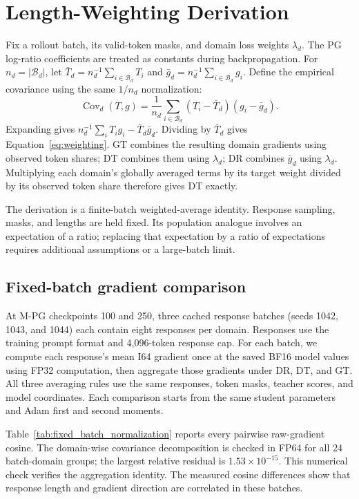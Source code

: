 \section{Length-Weighting Derivation}
\label{app:normalization}

Fix a rollout batch, its valid-token masks, and domain loss weights $\lambda_d$. The PG log-ratio coefficients are treated as constants during backpropagation. For $n_d=|\mathcal B_d|$, let $\bar T_d=n_d^{-1}\sum_{i\in\mathcal B_d}T_i$ and $\bar g_d=n_d^{-1}\sum_{i\in\mathcal B_d}g_i$. Define the empirical covariance using the same $1/n_d$ normalization:
\begin{equation}
\operatorname{Cov}_d(T,g)=\frac{1}{n_d}\sum_{i\in\mathcal B_d}(T_i-\bar T_d)(g_i-\bar g_d).
\end{equation}
Expanding gives $n_d^{-1}\sum_iT_i g_i-\bar T_d\bar g_d$. Dividing by $\bar T_d$ gives Equation~\ref{eq:weighting}. GT combines the resulting domain gradients using observed token shares; DT combines them using $\lambda_d$; DR combines $\bar g_d$ using $\lambda_d$. Multiplying each domain's globally averaged terms by its target weight divided by its observed token share therefore gives DT exactly.

The derivation is a finite-batch weighted-average identity. Response sampling, masks, and lengths are held fixed. Its population analogue involves an expectation of a ratio; replacing that expectation by a ratio of expectations requires additional assumptions or a large-batch limit.

\subsection{Fixed-batch gradient comparison}
\label{app:fixed_batch_normalization}

At M-PG checkpoints 100 and 250, three cached response batches (seeds 1042, 1043, and 1044) each contain eight responses per domain. Responses use the training prompt format and 4,096-token response cap. For each batch, we compute each response's mean I64 gradient once at the saved BF16 model values using FP32 computation, then aggregate those gradients under DR, DT, and GT. All three averaging rules use the same responses, token masks, teacher scores, and model coordinates. Each comparison starts from the same student parameters and Adam first and second moments.

Table~\ref{tab:fixed_batch_normalization} reports every pairwise raw-gradient cosine. The domain-wise covariance decomposition is checked in FP64 for all 24 batch-domain groups; the largest relative residual is $1.53\times10^{-15}$. This numerical check verifies the aggregation identity. The measured cosine differences show that response length and gradient direction are correlated in these batches.

